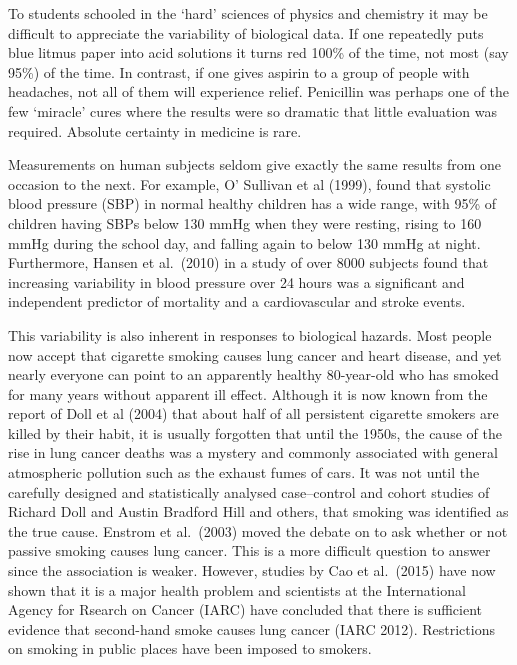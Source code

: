 \documentclass[
  16pt,
  letterpaper,
]{scrbook}
\begin{document}
To students schooled in the `hard' sciences of physics and chemistry it
may be difficult to appreciate the variability of biological data. If
one repeatedly puts blue litmus paper into acid solutions it turns red
100\% of the time, not most (say 95\%) of the time. In contrast, if one
gives aspirin to a group of people with headaches, not all of them will
experience relief. Penicillin was perhaps one of the few `miracle' cures
where the results were so dramatic that little evaluation was required.
Absolute certainty in medicine is rare.

Measurements on human subjects seldom give exactly the same results from
one occasion to the next. For example, O' Sullivan et al (1999), found
that systolic blood pressure (SBP) in normal healthy children has a wide
range, with 95\% of children having SBPs below 130 mmHg when they were
resting, rising to 160 mmHg during the school day, and falling again to
below 130 mmHg at night. Furthermore, Hansen et al.~(2010) in a study of
over 8000 subjects found that increasing variability in blood pressure
over 24 hours was a significant and independent predictor of mortality
and a cardiovascular and stroke events.

This variability is also inherent in responses to biological hazards.
Most people now accept that cigarette smoking causes lung cancer and
heart disease, and yet nearly everyone can point to an apparently
healthy 80-year-old who has smoked for many years without apparent ill
effect. Although it is now known from the report of Doll et al (2004)
that about half of all persistent cigarette smokers are killed by their
habit, it is usually forgotten that until the 1950s, the cause of the
rise in lung cancer deaths was a mystery and commonly associated with
general atmospheric pollution such as the exhaust fumes of cars. It was
not until the carefully designed and statistically analysed
case--control and cohort studies of Richard Doll and Austin Bradford
Hill and others, that smoking was identified as the true cause. Enstrom
et al.~(2003) moved the debate on to ask whether or not passive smoking
causes lung cancer. This is a more difficult question to answer since
the association is weaker. However, studies by Cao et al.~(2015) have
now shown that it is a major health problem and scientists at the
International Agency for Rsearch on Cancer (IARC) have concluded that
there is sufficient evidence that second-hand smoke causes lung cancer
(IARC 2012). Restrictions on smoking in public places have been imposed
to smokers.
\end{document}

